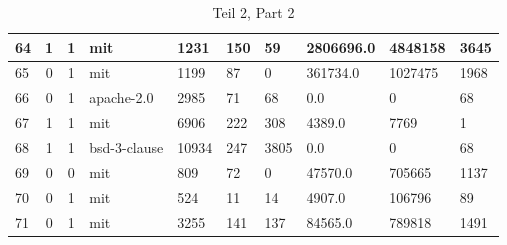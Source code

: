 \begin{landscape}
\begin{table}[]
{\begin{tabular}{lcclllllll}
                64 & 1                          & 1                     & mit              & 1231             & 150                   & 59                           & 2806696.0       & 4848158            & 3645                \\ \hline
                65 & 0                          & 1                     & mit              & 1199             & 87                    & 0                            & 361734.0        & 1027475            & 1968                \\ \hline
                66 & 0                          & 1                     & apache-2.0       & 2985             & 71                    & 68                           & 0.0             & 0                  & 68                  \\ \hline
                67 & 1                          & 1                     & mit              & 6906             & 222                   & 308                          & 4389.0          & 7769               & 1                   \\ \hline
                68 & 1                          & 1                     & bsd-3-clause     & 10934            & 247                   & 3805                         & 0.0             & 0                  & 68                  \\ \hline
                69 & 0                          & 0                     & mit              & 809              & 72                    & 0                            & 47570.0         & 705665             & 1137                \\ \hline
                70 & 0                          & 1                     & mit              & 524              & 11                    & 14                           & 4907.0          & 106796             & 89                  \\ \hline
                71 & 0                          & 1                     & mit              & 3255             & 141                   & 137                          & 84565.0         & 789818             & 1491
            \end{tabular}%
        }
        \caption*{Teil 2, Part 2}
    \end{table}
\end{landscape}


